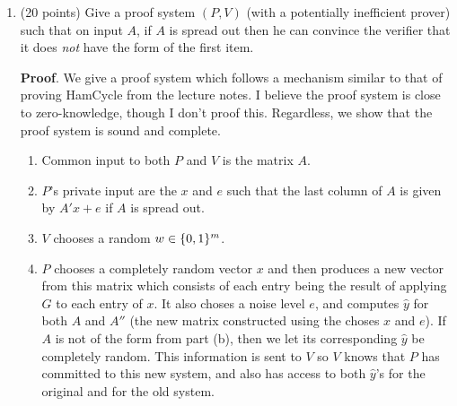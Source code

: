 \documentclass{article}
\begin{document}
\begin{enumerate}[,start=5]
\begin{enumerate}[noitemsep,topsep=\mdcompacttopsep,label=\alph*.]
\item{}(20 points) Give a proof system $(P,V)$ (with a potentially inefficient prover) such that on input $A$, if $A$ is spread out then he can convince the verifier that it does \emph{not} have the form of the first item.

\begin{mdbmarginx}{1ex}{0pt}{1ex}{0pt}%
\noindent{}\textbf{Proof}.  We give a proof system which follows a mechanism similar to that of proving HamCycle from the lecture
notes. I believe the proof system is close to zero-knowledge, though I don't proof this.
Regardless, we show that the proof system is sound and complete.%
\end{mdbmarginx}%

\begin{enumerate}[noitemsep,topsep=\mdcompacttopsep,label=\alph*.]%

\item{}Common input to both $P$ and $V$ is the matrix $A$.%

\item{}$P$'s private input are the $x$ and $e$ such that the last column of $A$ is given by $A'x + e$
if $A$ is spread out. %

\item{}$V$ chooses a random $w \in \{0,1\}^m$.%

\item{}$P$ chooses a completely random vector $x$ and then produces a new vector from this
matrix which consists of each entry being the result of applying $G$ to each entry of $x$.
It also choses a noise level $e$, and computes $\hat{y}$ for both $A$ and $A''$ (the new 
matrix constructed using the choses $x$ and $e$). If $A$ is not of the form from part (b),
then we let its corresponding $\hat{y}$ be completely random. This
information is sent to $V$ so $V$ knows that $P$ has committed to this new system, and also has
access to both $\hat{y}$'s for the original and for the old system.%


\end{enumerate}
\end{enumerate}
\end{enumerate}
\end{document}
